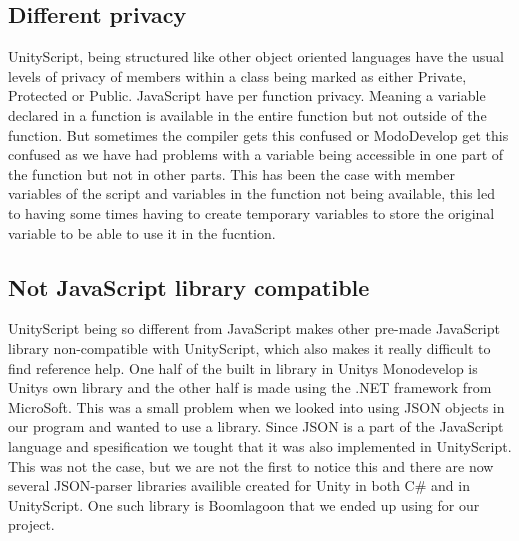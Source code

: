 \subsection {Different privacy}
UnityScript, being structured like other object oriented languages have the usual levels of privacy of members within a class being marked as either Private, Protected or Public. 
JavaScript have per function privacy. 
Meaning a variable declared in a function is available in the entire function but not outside of the function.
But sometimes the compiler gets this confused or ModoDevelop get this confused as we have had problems with a variable being accessible in one part of the function but not in other parts.
This has been the case with member variables of the script and variables in the function not being available, this led to having some times having to create temporary variables to store the original variable to be able to use it in the fucntion.
%

\subsection {Not JavaScript library compatible}
UnityScript being so different from JavaScript makes other pre-made JavaScript library non-compatible with UnityScript, which also makes it really difficult to find reference help. 
One half of the built in library in Unitys Monodevelop is Unitys own library and the other half is made using the .NET framework from MicroSoft.
This was a small problem when we looked into using {JSON} objects in our program and wanted to use a library.
Since {JSON} is a part of the JavaScript language and spesification we tought that it was also implemented in UnityScript.
This was not the case, but we are not the first to notice this and there are now several {JSON}-parser libraries availible created for Unity in both C\# and in UnityScript.
One such library is Boomlagoon\cite{Boomlagoon.JSON} that we ended up using for our project.
